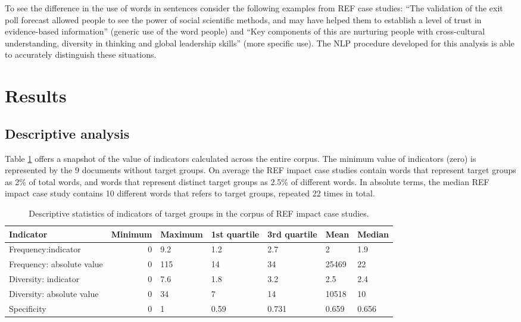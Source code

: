 \documentclass[]{book}
\theoremstyle{definition}
\theoremstyle{definition}
\theoremstyle{definition}
\theoremstyle{remark}
\begin{document}
To see the difference in the use of words in sentences consider the
following examples from REF case studies: ``The validation of the exit
poll forecast allowed people to see the power of social scientific
methods, and may have helped them to establish a level of trust in
evidence-based information'' (generic use of the word people) and ``Key
components of this are nurturing people with cross-cultural
understanding, diversity in thinking and global leadership skills''
(more specific use). The NLP procedure developed for this analysis is
able to accurately distinguish these situations.

\section{Results}\label{results-12}

\subsection{Descriptive analysis}\label{descriptive-analysis}

Table \ref{tab:impact2} offers a snapshot of the value of indicators
calculated across the entire corpus. The minimum value of indicators
(zero) is represented by the 9 documents without target groups. On
average the REF impact case studies contain words that represent target
groups as 2\% of total words, and words that represent distinct target
groups as 2.5\% of different words. In absolute terms, the median REF
impact case study contains 10 different words that refers to target
groups, repeated 22 times in total.

\begin{table}

\caption{\label{tab:impact2}Descriptive statistics of indicators of target groups in the corpus of REF impact case studies.}
\centering
\begin{tabular}[t]{lrlllll}
\toprule
Indicator & Minimum & Maximum & 1st quartile & 3rd quartile & Mean & Median\\
\midrule
Frequency:indicator & 0 & 9.2 & 1.2 & 2.7 & 2 & 1.9\\
Frequency: absolute value & 0 & 115 & 14 & 34 & 25469 & 22\\
Diversity: indicator & 0 & 7.6 & 1.8 & 3.2 & 2.5 & 2.4\\
Diversity: absolute value & 0 & 34 & 7 & 14 & 10518 & 10\\
Specificity & 0 & 1 & 0.59 & 0.731 & 0.659 & 0.656\\
\bottomrule
\end{tabular}
\end{table}
\end{document}
